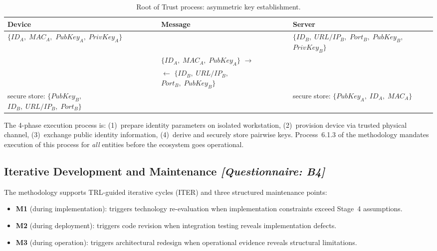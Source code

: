 \documentclass[12pt,a4paper]{article}
\newcommand{\qtag}[1]{\hfill\textcolor{gray!70}{\small\textit{[Questionnaire: #1]}}}
\begin{document}
\begin{table}[htbp]
  \centering
  \caption{Root of Trust process: asymmetric key establishment.}
  \label{tab:rotpasym}
  \small
  \begin{tabular}{
      >{\centering\arraybackslash}p{3.8cm}
      c
      >{\centering\arraybackslash}p{4.0cm}
      c
      >{\centering\arraybackslash}p{3.8cm}
  }
    \toprule
    \textbf{Device} & & \textbf{Message} & & \textbf{Server} \\
    \midrule
    $\{ID_A,\;MAC_A,$ $PubKey_A,\;PrivKey_A\}$ & & & & $\{ID_B,\;URL/IP_B,$ $Port_B,\;PubKey_B,$ $PrivKey_B\}$ \\
    & & $\{ID_A,\;MAC_A,\;PubKey_A\}$ ${\rightarrow}$ & & \\
    & & ${\leftarrow}$ $\{ID_B,\;URL/IP_B,$ $Port_B,\;PubKey_B\}$ & & \\
    secure store: $\{PubKey_B,$ $ID_B,\;URL/IP_B,\;Port_B\}$ & & & & secure store: $\{PubKey_A,\;ID_A,\;MAC_A\}$ \\
    \bottomrule
  \end{tabular}
\end{table}

The 4-phase execution process is: (1)~prepare identity parameters on isolated workstation, (2)~provision device via trusted physical channel, (3)~exchange public identity information, (4)~derive and securely store pairwise keys. Process~6.1.3 of the methodology mandates execution of this process for \emph{all} entities before the ecosystem goes operational.

\subsection{Iterative Development and Maintenance \qtag{B4}}
\label{sec:iter}

The methodology supports TRL-guided iterative cycles (ITER) and three structured maintenance points:
\begin{itemize}[noitemsep]
  \item \textbf{M1} (during implementation): triggers technology re-evaluation when implementation constraints exceed Stage~4 assumptions.
  \item \textbf{M2} (during deployment): triggers code revision when integration testing reveals implementation defects.
  \item \textbf{M3} (during operation): triggers architectural redesign when operational evidence reveals structural limitations.
\end{itemize}
\end{document}
